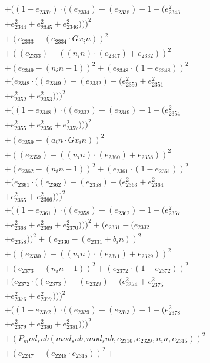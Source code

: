 \documentclass[10pt, a4paper]{article}
\begin{document}
\begin{small}
\begin{align*}
& + ((1 - e_{2337})  \cdot  ((e_{2334}) - (e_{2338}) - 1 - (e_{2343}^{2} \\
& + e_{2344}^{2} + e_{2345}^{2} + e_{2346}^{2})))^{2} \\
& + (e_{2333} - (e_{2334}  \cdot  Gx_in))^{2} \\
& + ((e_{2333}) - ((n_in)  \cdot  (e_{2347}) + e_{2332}))^{2} \\
& + (e_{2349} - (n_in - 1))^{2} + (e_{2348}  \cdot  (1 - e_{2348}))^{2} \\
& + (e_{2348}  \cdot  ((e_{2349}) - (e_{2332}) - (e_{2350}^{2} + e_{2351}^{2} \\
& + e_{2352}^{2} + e_{2353}^{2})))^{2} \\
& + ((1 - e_{2348})  \cdot  ((e_{2332}) - (e_{2349}) - 1 - (e_{2354}^{2} \\
& + e_{2355}^{2} + e_{2356}^{2} + e_{2357}^{2})))^{2} \\
& + (e_{2359} - (a_in  \cdot  Gx_in))^{2} \\
& + ((e_{2359}) - ((n_in)  \cdot  (e_{2360}) + e_{2358}))^{2} \\
& + (e_{2362} - (n_in - 1))^{2} + (e_{2361}  \cdot  (1 - e_{2361}))^{2} \\
& + (e_{2361}  \cdot  ((e_{2362}) - (e_{2358}) - (e_{2363}^{2} + e_{2364}^{2} \\
& + e_{2365}^{2} + e_{2366}^{2})))^{2} \\
& + ((1 - e_{2361})  \cdot  ((e_{2358}) - (e_{2362}) - 1 - (e_{2367}^{2} \\
& + e_{2368}^{2} + e_{2369}^{2} + e_{2370}^{2})))^{2} + (e_{2331} - (e_{2332} \\
& + e_{2358}))^{2} + (e_{2330} - (e_{2331} + b_in))^{2} \\
& + ((e_{2330}) - ((n_in)  \cdot  (e_{2371}) + e_{2329}))^{2} \\
& + (e_{2373} - (n_in - 1))^{2} + (e_{2372}  \cdot  (1 - e_{2372}))^{2} \\
& + (e_{2372}  \cdot  ((e_{2373}) - (e_{2329}) - (e_{2374}^{2} + e_{2375}^{2} \\
& + e_{2376}^{2} + e_{2377}^{2})))^{2} \\
& + ((1 - e_{2372})  \cdot  ((e_{2329}) - (e_{2373}) - 1 - (e_{2378}^{2} \\
& + e_{2379}^{2} + e_{2380}^{2} + e_{2381}^{2})))^{2} \\
& + (P_mod_sub(mod_sub, mod_sub, e_{2316}, e_{2329}, n_in, e_{2315}))^{2} \\
& + (e_{2247} - (e_{2248}  \cdot  e_{2315}))^{2} + \\

\end{align*}
\end{small}
\end{document}

